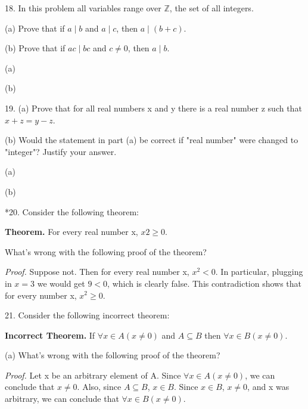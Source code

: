 \documentclass{article}
\begin{document}
18. In this problem all variables range over $\mathbb{Z}$, the set of all integers.

\hspace{12pt}(a) Prove that if $a \mid b$ and $a \mid c$, then $a \mid (b + c)$.

\hspace{12pt}(b) Prove that if $ac \mid bc$ and $c \neq 0$, then $a \mid b$.
\vspace{30pt}

(a)

\vspace{20pt}

(b)

\vspace{30pt}

19. (a) Prove that for all real numbers x and y there is a real number z such
that $x + z = y - z$.

\hspace{12pt}(b) Would the statement in part (a) be correct if "real number" were
changed to "integer"? Justify your answer.
\vspace{30pt}

(a)

\vspace{20pt}

(b)

\vspace{30pt}

*20. Consider the following theorem:

\textbf{Theorem.} For every real number x, $x 2 \geq 0$.

What's wrong with the following proof of the theorem?

\textit{Proof.} Suppose not. Then for every real number x, $x^2 < 0$. In particular,
plugging in $x = 3$ we would get $9 < 0$, which is clearly false. This
contradiction shows that for every number x, $x^2 \geq 0$.
\vspace{30pt}



\vspace{30pt}

21. Consider the following incorrect theorem:

\textbf{Incorrect Theorem.} If $\forall x \in A(x \neq 0)$ and $A \subseteq B$ then $\forall x \in B(x
\neq 0)$.

\hspace{12pt}(a) What's wrong with the following proof of the theorem?

\textit{Proof.} Let x be an arbitrary element of A. Since $\forall x \in A(x \neq 0)$,
we can conclude that $x \neq 0$. Also, since $A \subseteq B$, $x \in B$. Since
$x \in B$, $x \neq 0$, and x was arbitrary, we can conclude that $\forall x \in
B(x \neq 0)$.
\end{document}
